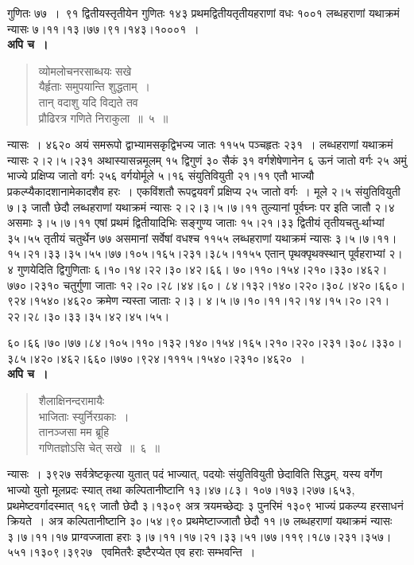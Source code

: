 \documentclass[11pt, openany]{book}
\begin{document}
\newpage

\noindent गुणितः ७७~।~९१ द्वितीयस्तृतीयेन गुणितः १४३ प्रथमद्वितीयतृतीयहराणां वधः १००१ लब्धहराणां यथाक्रमं न्यासः ७।११।१३।७७।९१।१४३।१०००१~। \\

\textbf{अपि च~।}

\begin{quote}
{\ex व्योमलोचनरसाब्धयः सखे\\
यैर्हृताः समुपयान्ति शुद्धताम्~।\\
तान् वदाशु यदि विद्यते तव\\
प्रौढिरत्र गणिते निराकुला~॥~५~॥}
\end{quote}

न्यासः~। ४६२० अयं समरूपो द्वाभ्यामसकृद्विभज्य जातः ११५५ पञ्चहृतः २३१~। लब्धहराणां यथाक्रमं न्यासः २।२।५।२३१ अथास्यासन्नमूलम् १५ द्विगुणं ३० सैकं ३१ वर्गशेषेणानेन ६ ऊनं जातो वर्गः २५ अमुं भाज्ये प्रक्षिप्य जातो वर्गः २५६ वर्गयोर्मूले ५।१६ संयुतिवियुती २१।११ एतौ भाज्यौ प्रकल्प्यैकादशानामेकादशैव हरः~। एकविंशतौ रूपद्वयवर्गं प्रक्षिप्य २५ जातो वर्गः~। मूले २।५ संयुतिवियुती ७।३ जातौ छेदौ लब्धहराणां यथाक्रमं न्यासः २।२।३।५।७।११ तुल्यानां पूर्वघ्नः पर इति जातौ २।४ असमाः ३।५।७।११ एषां प्रथमं द्वितीयादिभिः सङ्गुण्य जाताः १५।२१।३३ द्वितीयं तृतीयचतु-र्थाभ्यां ३५।५५ तृतीयं चतुर्थेन ७७ असमानां सर्वेषां वधश्च ११५५ लब्धहराणां यथाक्रमं न्यासः \;३।५।७।११।१५।२१।३३।३५।५५।७७।१०५।१६५।२३१।३८५।११५५ \;एतान् पृथक्पृथक्स्थान् पूर्वहराभ्यां २।४ गुणयेदिति द्विगुणिताः ६।१०।१४।२२।३०।४२।६६। ७०।११०।१५४।२१०।३३०।४६२।७७०।२३१० चतुर्गुणा जाताः १२।२०।२८।४४।६०। ८४।१३२।१४०।२२०।३०८।४२०।६६०।९२४।१५४०।४६२० क्रमेण न्यस्ता जाताः २।३। ४।५।७।१०।११।१२।१४।१५।२०।२१।२२।२८।३०।३३।३५।४२।४५।५५।

\newpage

\noindent ६०।६६।७०।७७।८४।१०५।११०।१३२।१४०।१५४।१६५।२१०।२२०।२३१।३०८।३३०। ३८५।४२०।४६२।६६०।७७०।९२४।१११५।१५४०।२३१०।४६२०~।\\

\textbf{अपि च~।} 

\begin{quote}
{\ex शैलाक्षिनन्दरामायैः\\
भाजिताः स्युर्निरग्रकाः~।\\
तानञ्जसा मम ब्रूहि\\
गणितज्ञोऽसि चेत् सखे~॥~६~॥~}
\end{quote}

न्यासः~। ३९२७ सर्वत्रेष्टकृत्या युतात् पदं भाज्यात्, पदयोः संयुतिवियुती छेदाविति सिद्धम्, यस्य वर्गेण भाज्यो युतो मूलप्रदः स्यात् तथा कल्पितानीष्टानि १३।४७।८३। १०७।१७३।२७७।६५३, प्रथमेष्टवर्गादस्मात् १६९ जातौ छेदौ ३।१३०९ अत्र त्रयमच्छेद्यः ३ पुनरिमं १३०९ भाज्यं प्रकल्प्य हरसाधनं क्रियते~। अत्र कल्पितानीष्टानि ३०।५४।९० प्रथमेष्टाज्जातौ छेदौ ११।७ लब्धहराणां यथाक्रमं न्यासः ३।७।११।१७ प्राग्वज्जाता हराः ३।७।११।१७।२१।३३।५१।७७।११९।१८७।२३१।३५७।५५१।१३०९।३९२७ ~एवमितरैः इष्टैरप्येत एव हराः सम्भवन्ति~। \\
\end{document}
